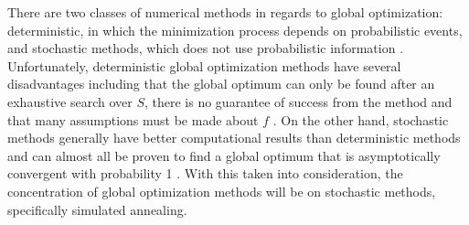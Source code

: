 There are two classes of numerical methods in regards to global optimization: deterministic, in which the minimization process depends on probabilistic events, and stochastic methods, which does not use probabilistic information \cite{dekkers}. Unfortunately, deterministic global optimization methods have several disadvantages including that the global optimum can only be found after an exhaustive search over $S$, there is no guarantee of success from the method and that many assumptions must be made about $f$ \cite{dekkers}. On the other hand, stochastic methods generally have better computational results than deterministic methods and can almost all be proven to find a global optimum that is asymptotically convergent with probability 1 \cite{dekkers}. With this taken into consideration, the concentration of global optimization methods will be on stochastic methods, specifically simulated annealing. 



